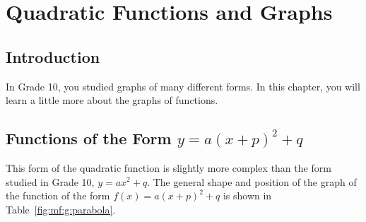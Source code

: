 \chapter{Quadratic Functions and Graphs}
\label{m:fg:q11}

\section{Introduction}
In Grade 10, you studied graphs of many different forms. In this chapter, you will learn a little more about the graphs of functions.


\section{Functions of the Form $y=a(x+p)^2+q$}
This form of the quadratic function is slightly more complex than the form studied in Grade 10, $y=ax^2+q$. The general shape and position of the graph of the function of the form $f(x)=a(x+p)^2+q$ is shown in Table~\ref{fig:mf:g:parabola}.\\

